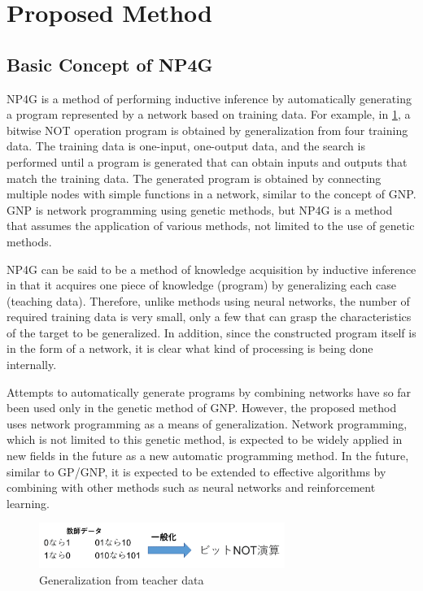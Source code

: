 \documentclass{article}
\begin{document}
\section {Proposed Method}
\subsection{Basic Concept of NP4G}
NP4G is a method of performing inductive inference by automatically generating a program represented by a network based on training data.
For example, in \ref{fig:summary}, a bitwise NOT operation program is obtained by generalization from four training data.
The training data is one-input, one-output data, and the search is performed until a program is generated that can obtain inputs and outputs that match the training data.
The generated program is obtained by connecting multiple nodes with simple functions in a network, similar to the concept of GNP.
GNP is network programming using genetic methods, but NP4G is a method that assumes the application of various methods, not limited to the use of genetic methods.

NP4G can be said to be a method of knowledge acquisition by inductive inference in that it acquires one piece of knowledge (program) by generalizing each case (teaching data).
Therefore, unlike methods using neural networks, the number of required training data is very small, only a few that can grasp the characteristics of the target to be generalized.
In addition, since the constructed program itself is in the form of a network, it is clear what kind of processing is being done internally.

Attempts to automatically generate programs by combining networks have so far been used only in the genetic method of GNP.
However, the proposed method uses network programming as a means of generalization.
Network programming, which is not limited to this genetic method, is expected to be widely applied in new fields in the future as a new automatic programming method.
In the future, similar to GP/GNP, it is expected to be extended to effective algorithms by combining with other methods such as neural networks and reinforcement learning.

\begin{figure}[t]
\begin{center}
\includegraphics[width=80mm]{summary.png}
\end{center}
\caption {Generalization from teacher data}
\label{fig:summary}
\end{figure}
\end{document}
